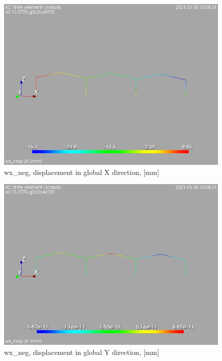 \cleardoublepage
\begin{figure}
\begin{center}
\includegraphics[width=\linewidth]{calc_results/sole_zeinali/text/graphics/resSimplLC/wx_negtotaluX}
\caption{wx_neg, displacement in global X direction, [mm]}
\end{center}
\end{figure}
\begin{figure}
\begin{center}
\includegraphics[width=\linewidth]{calc_results/sole_zeinali/text/graphics/resSimplLC/wx_negtotaluY}
\caption{wx_neg, displacement in global Y direction, [mm]}
\end{center}
\end{figure}
